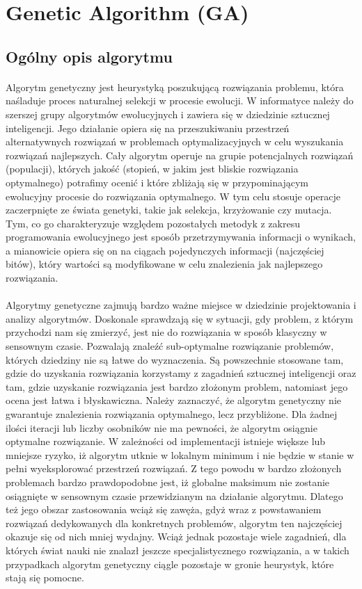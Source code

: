 \section{Genetic Algorithm (GA)}
\author{Filip Czajkowski}
\subsection{Ogólny opis algorytmu}
\label{genetic_description}
\paragraph{}Algorytm genetyczny jest heurystyką poszukującą rozwiązania problemu, która naśladuje proces naturalnej selekcji w procesie ewolucji. W informatyce należy do szerszej grupy algorytmów ewolucyjnych i zawiera się w dziedzinie sztucznej inteligencji. Jego działanie opiera się na przeszukiwaniu przestrzeń alternatywnych rozwiązań w problemach optymalizacyjnych w celu wyszukania rozwiązań najlepszych. Cały algorytm operuje na grupie potencjalnych rozwiązań (populacji), których jakość (stopień, w jakim jest bliskie rozwiązania optymalnego) potrafimy ocenić i które zbliżają się w przypominającym ewolucyjny procesie do rozwiązania optymalnego. W tym celu stosuje operacje zaczerpnięte ze świata genetyki, takie jak selekcja, krzyżowanie czy mutacja. Tym, co go charakteryzuje względem pozostałych metodyk z zakresu programowania ewolucyjnego jest sposób przetrzymywania informacji o wynikach, a mianowicie opiera się on na ciągach pojedynczych informacji (najczęściej bitów), który wartości są modyfikowane w celu znalezienia jak najlepszego rozwiązania.
\paragraph{}Algorytmy genetyczne zajmują bardzo ważne miejsce w dziedzinie projektowania i analizy algorytmów. Doskonale sprawdzają się w sytuacji, gdy problem, z którym przychodzi nam się zmierzyć, jest nie do rozwiązania w sposób klasyczny w sensownym czasie. Pozwalają znaleźć sub-optymalne rozwiązanie problemów, których dziedziny nie są łatwe do wyznaczenia. Są powszechnie stosowane tam, gdzie do uzyskania rozwiązania korzystamy z zagadnień sztucznej inteligencji oraz tam, gdzie uzyskanie rozwiązania jest bardzo złożonym problem, natomiast jego ocena jest łatwa i błyskawiczna. Należy zaznaczyć, że algorytm genetyczny nie gwarantuje znalezienia rozwiązania optymalnego, lecz przybliżone. Dla żadnej ilości iteracji lub liczby osobników nie ma pewności, że algorytm osiągnie optymalne rozwiązanie. W zależności od implementacji istnieje większe lub mniejsze ryzyko, iż algorytm utknie w lokalnym minimum i nie będzie w stanie w pełni wyeksplorować przestrzeń rozwiązań. Z tego powodu w bardzo złożonych problemach bardzo prawdopodobne jest, iż globalne maksimum nie zostanie osiągnięte w sensownym czasie przewidzianym na działanie algorytmu. Dlatego też jego obszar zastosowania wciąż się zawęża, gdyż wraz z powstawaniem rozwiązań dedykowanych dla konkretnych problemów, algorytm ten najczęściej okazuje się od nich mniej wydajny. Wciąż jednak pozostaje wiele zagadnień, dla których świat nauki nie znalazł jeszcze specjalistycznego rozwiązania, a w takich przypadkach algorytm genetyczny ciągle pozostaje w gronie heurystyk, które stają się pomocne.
